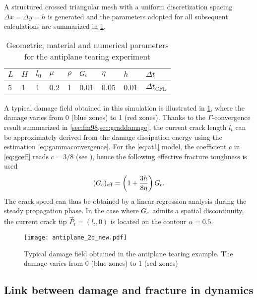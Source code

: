 A structured crossed triangular mesh with a uniform discretization spacing $\Delta x=\Delta y=h$ is generated and the parameters adopted for all subsequent calculations are summarized in \cref{tab:paraanti}.
\begin{table}[htbp]
\centering
\caption{Geometric, material and numerical parameters for the antiplane tearing experiment} \label{tab:paraanti}
\begin{tabular}{lllllllll} \toprule
$L$ & $H$ & $l_0$ & $\mu$ & $\rho$ & $G_\mathrm{c}$ & $\eta$ & $h$ & $\Delta t$\\ \midrule
5 & 1 & 1 & 0.2 & 1 & 0.01 & 0.05 & 0.01 & $\Delta t_\mathrm{CFL}$ \\ \bottomrule
\end{tabular}
\end{table}
A typical damage field obtained in this simulation is illustrated in \cref{fig:antiplane_2d_new}, where the damage varies from 0 (blue zones) to 1 (red zones). Thanks to the $\Gamma$-convergence result summarized in \cref{sec:fm98,sec:graddamage}, the current crack length $l_t$ can be approximately derived from the damage dissipation energy using the estimation \eqref{eq:gammaconvergence}. For the \eqref{eq:at1} model, the coefficient $c$ in \eqref{eq:gceff} reads $c=3/8$ (see \cite{HossainHsuehBourdinBhattachary:2014}), hence the following effective fracture toughness is used
\[
(G_\mathrm{c})_\mathrm{eff}=\left(1+\frac{3h}{8\eta}\right)G_\mathrm{c}.
\]
The crack speed can thus be obtained by a linear regression analysis during the steady propagation phase. In the case where $G_\mathrm{c}$ admits a spatial discontinuity, the current crack tip $\vec{P}_t=(l_t,0)$ is located on the contour $\alpha=0.5$.
\begin{figure}[htbp]
\centering
\texttt{[image: antiplane\_2d\_new.pdf]}
\caption{Typical damage field obtained in the antiplane tearing example. The damage varies from 0 (blue zones) to 1 (red zones)} \label{fig:antiplane_2d_new}
\end{figure}

\subsection{Link between damage and fracture in dynamics} \label{sec:homo}
